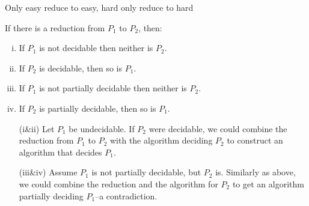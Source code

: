 \documentclass[handout]{beamer}
\begin{document}
\begin{frame}{Only easy reduce to easy, hard only reduce to hard}

    \begin{theorem}
        If there is a reduction from $P_1$ to $P_2$, then:
        \begin{enumerate}[(i)]            
            \item If $P_1$ is not decidable then neither is $P_2$.
            \item If $P_2$ is decidable, then so is $P_1$.
            \item If $P_1$ is not partially decidable then neither is $P_2$. 
            \item If $P_2$ is partially decidable, then so is $P_1$.
        \end{enumerate}
    \end{theorem}

    \begin{itemize}
        \item[(i\&ii)] Let $P_1$ be undecidable. If $P_2$ were decidable, we could combine the reduction from $P_1$ to $P_2$ with the algorithm deciding $P_2$ to construct an algorithm that decides $P_1$.
        \item[(iii\&iv)] Assume $P_1$ is not partially decidable, but $P_2$ is. Similarly as above, we could combine the reduction and the algorithm for $P_2$ to get an algorithm partially deciding $P_1$--a contradiction.\hfill\qedsymbol
    \end{itemize}       

\end{frame}
\end{document}
